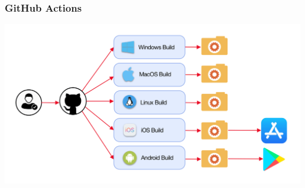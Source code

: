 \begin{frame}
    \frametitle{GitHub Actions}

    \includegraphics[width=\textwidth]{Bin/github_actions.png}

\end{frame}

